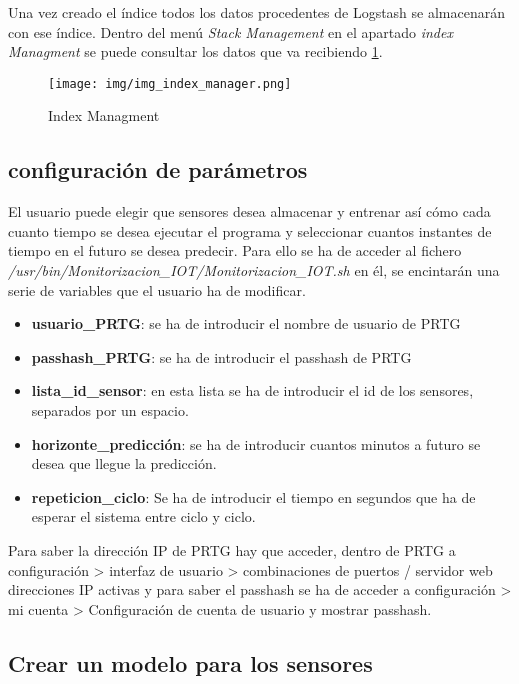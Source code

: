 Una vez creado el índice todos los datos procedentes de Logstash se almacenarán con ese índice.
Dentro del menú \textit{Stack Management} en el apartado \textit{index Managment} se puede consultar los datos que va recibiendo \ref{img_index_manager.png}.

\begin{figure}[h]
	\centering
	\texttt{[image: img/img\_index\_manager.png]}
	\caption{Index Managment}
	\label{img_index_manager.png}
\end{figure}

\newpage

\subsection{configuración de parámetros}

El usuario puede elegir que sensores desea almacenar y entrenar así cómo cada cuanto tiempo se desea ejecutar el programa y seleccionar cuantos instantes de tiempo en el futuro se desea predecir. Para ello se ha de acceder al fichero \textit{/usr/bin/Monitorizacion\_IOT/Monitorizacion\_IOT.sh} en él, se encintarán una serie de variables que el usuario ha de modificar.

\begin{itemize}
    \item \textbf{usuario\_PRTG}: se ha de introducir el nombre de usuario de PRTG
    \item \textbf{passhash\_PRTG}: se ha de introducir el passhash de PRTG
    \item \textbf{lista\_id\_sensor}: en esta lista se ha de introducir el id de los sensores, separados por un espacio.
    \item \textbf{horizonte\_predicción}: se ha de introducir cuantos minutos a futuro se desea que llegue la predicción.
    \item \textbf{repeticion\_ciclo}: Se ha de introducir el tiempo en segundos que ha de esperar el sistema entre ciclo y ciclo. 
\end{itemize}

Para saber la dirección IP de PRTG hay que acceder, dentro de PRTG a configuración > interfaz de usuario > combinaciones de puertos / servidor web direcciones IP activas y para saber el passhash se ha de acceder a configuración > mi cuenta > Configuración de cuenta de usuario y mostrar passhash.

\subsection{Crear un modelo para los sensores}

